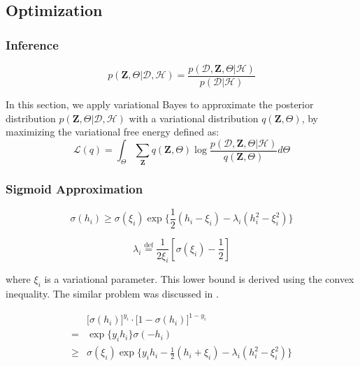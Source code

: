 \subsection{Optimization}

\subsubsection{Inference}

\begin{equation}
p(\bm{Z},\Theta|\mathcal{D},\mathcal{H}) = \frac{p(\mathcal{D},\bm{Z},\Theta|\mathcal{H})}{p(\mathcal{D}|\mathcal{H})}
\end{equation}

In this section, we apply variational Bayes to approximate the posterior distribution $p(\bm{Z},\Theta|\mathcal{D},\mathcal{H})$ with a variational distribution $q(\bm{Z},\Theta)$, by maximizing the variational free energy defined as:
\begin{equation}
\mathcal{L}(q)= \int_\Theta \sum_{\bm{Z}} q(\bm{Z},\Theta) \log\frac{p(\mathcal{D},\bm{Z},\Theta|\mathcal{H})}{q(\bm{Z},\Theta)}d\Theta
\end{equation}

\subsubsection{Sigmoid Approximation}

\begin{equation}
\sigma(h_{i}) \geq \sigma(\xi_{i})\exp\big\{\frac{1}{2}(h_{i}-\xi_{i})-\lambda_{i}(h_{i}^2-\xi_{i}^2)\big\}
\end{equation}

$$\lambda_{i}\overset{\mathrm{def}}=\frac{1}{2\xi_{i}}[\sigma(\xi_{i})-\frac{1}{2}]$$

\noindent where $\xi_{i}$ is a variational parameter. This lower bound is derived using the convex inequality. The similar problem was discussed in \cite{jaakkola1997variational,jordan1999introduction}.

\begin{align}
& \big[\sigma(h_{i})\big]^{y_i} \cdot  \big[1-\sigma(h_{i}) \big]^{1-y_i} \\
= & \exp\big\{ y_i h_i \big\} \sigma(-h_{i}) \\
\geq & \sigma(\xi_{i})\exp\big\{y_i h_{i}-\frac{1}{2}(h_{i}+\xi_{i})-\lambda_{i}(h_{i}^2-\xi_{i}^2)\big\}
\end{align}


